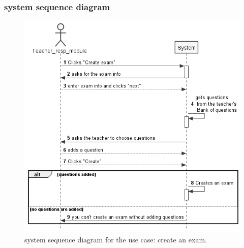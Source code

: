 \documentclass[]{uc2pfecaneva}
\begin{document}
    \subsubsection{system sequence diagram}
    \begin{figure}[h]

        \centering
        \includegraphics[width=\textwidth]{images/Create_Exam}

        \caption{system sequence diagram for the use case: create an exam.}
    \end{figure}
    \clearpage
\end{document}
